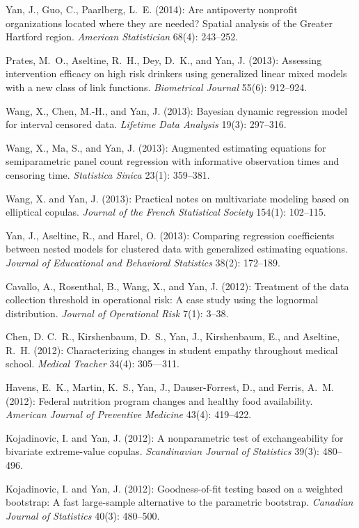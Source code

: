 \documentclass[Statistics]{vita}
\begin{document}
\begin{vita}
\begin{Publications}
\begin{RefereedJournalArticles}
  \item Yan, J., Guo, C., Paarlberg, L.~E. (2014): Are antipoverty nonprofit organizations located where they are needed? Spatial analysis of the Greater Hartford region. {\em American Statistician\/} 68(4): 243--252.
  \item *Prates, M.~O., Aseltine, R.~H., Dey, D.~K., and Yan, J. (2013): Assessing intervention efficacy on high risk drinkers using generalized linear mixed models with a new class of link functions. {\em Biometrical Journal\/} 55(6): 912--924.
  \item *Wang, X., Chen, M.-H., and Yan, J. (2013): Bayesian dynamic regression model for interval censored data. {\em Lifetime Data Analysis\/} 19(3): 297--316.
  \item *Wang, X., Ma, S., and Yan, J. (2013): Augmented estimating equations for semiparametric panel count regression with informative observation times and censoring time. {\em Statistica Sinica\/} 23(1): 359--381.
  \item *Wang, X. and Yan, J. (2013): Practical notes on multivariate modeling based on elliptical copulas. {\em Journal of the French Statistical Society\/} 154(1): 102--115.
  \item Yan, J., Aseltine, R., and Harel, O. (2013): Comparing regression coefficients between nested models for clustered data with generalized estimating equations. {\em Journal of Educational and Behavioral Statistics\/} 38(2): 172--189.
  \item Cavallo, A., Rosenthal, B., Wang, X., and Yan, J. (2012): Treatment of the data collection threshold in operational risk: {A} case study using the lognormal distribution. {\em Journal of Operational Risk\/} 7(1): 3--38.
  \item Chen, D. C.~R., Kirshenbaum, D.~S., Yan, J., Kirshenbaum, E., and Aseltine,  R.~H. (2012): Characterizing changes in student empathy throughout medical school. {\em Medical Teacher\/} 34(4): 305--–311.
  \item Havens, E.~K., Martin, K.~S., Yan, J., Dauser-Forrest, D., and Ferris, A.~M. (2012): Federal nutrition program changes and healthy food availability. {\em  American Journal of Preventive Medicine\/} 43(4): 419--422.
  \item Kojadinovic, I. and Yan, J. (2012): A nonparametric test of exchangeability for bivariate extreme-value copulas. {\em Scandinavian Journal of Statistics\/} 39(3): 480--496.
  \item Kojadinovic, I. and Yan, J. (2012): Goodness-of-fit testing based on a weighted bootstrap: A fast large-sample alternative to the parametric bootstrap. {\em Canadian Journal of Statistics\/} 40(3): 480--500.

\end{RefereedJournalArticles}
\end{Publications}
\end{vita}
\end{document}
